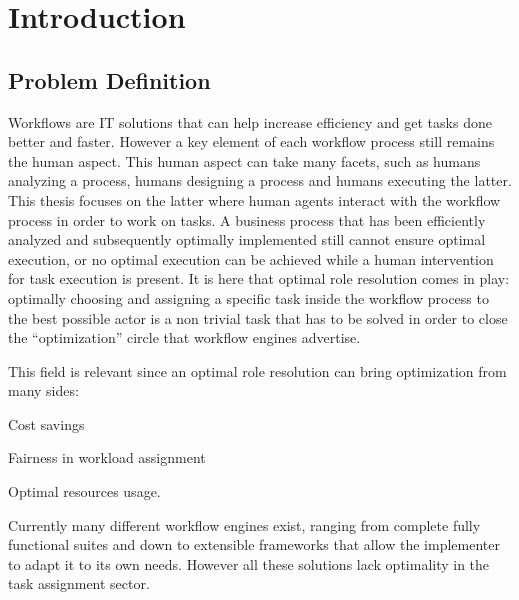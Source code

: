 \documentclass{seal_thesis}
\begin{document}
\begin{zusammenfassung}
\end{zusammenfassung}

\tableofcontents

\clearpage

\listoffigures

\clearpage

\listoftables

\mainmatter

\chapter{Introduction}
\label{ch:intro}

\section{Problem Definition}

Workflows are IT solutions that can help increase efficiency and get tasks done better and faster. However a key element of each workflow process still remains the human aspect. This human aspect can take many facets, such as humans analyzing a process, humans designing a process and humans executing the latter. This thesis focuses on the latter \ie where human agents interact with the workflow process in order to work on tasks. A business process that has been efficiently analyzed and subsequently optimally implemented still cannot ensure optimal execution, or no optimal execution can be achieved while a human intervention for task execution is present. It is here that optimal role resolution comes in play: optimally choosing and assigning a specific task inside the workflow process to the best possible actor is a non trivial task that has to be solved in order to close the ``optimization'' circle that workflow engines advertise.

This field is relevant since an optimal role resolution can bring optimization from many sides:
\begin{enumerate*}
	\item Cost savings
	\item Fairness in workload assignment
	\item Optimal resources usage.
\end{enumerate*}

Currently many different workflow engines exist, ranging from complete fully functional suites and down to extensible frameworks that allow the implementer to adapt it to its own needs. However all these solutions lack optimality in the task assignment sector.
\end{document}
